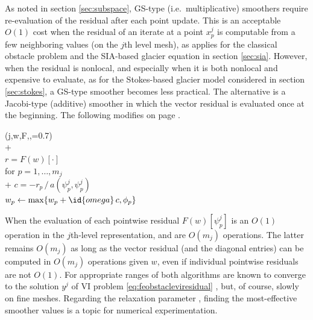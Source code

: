 \documentclass[letterpaper,final,12pt,reqno]{amsart}
\theoremstyle{claim}
\numberwithin{equation}{section}
\numberwithin{figure}{section}
\numberwithin{table}{section}
\numberwithin{theorem}{section}
\begin{document}
As noted in section \ref{sec:subspace}, GS-type (i.e.~multiplicative) smoothers require re-evaluation of the residual after each point update.  This is an acceptable $O(1)$ cost when the residual of an iterate at a point $x_p^j$ is computable from a few neighboring values (on the $j$th level mesh), as applies for the classical obstacle problem and the SIA-based glacier equation in section \ref{sec:sia}.  However, when the residual is nonlocal, and especially when it is both nonlocal and expensive to evaluate, as for the Stokes-based glacier model considered in section \ref{sec:stokes}, a GS-type smoother becomes less practical.  The alternative is a Jacobi-type (additive) smoother in which the vector residual is evaluated once at the beginning.  The following modifies  on page \pageref{ps:jacobi-sweep}.
\begin{pseudo*} \label{ps:pjacobi-sweep}
(j,w,F,\phi,=0.7)\text{:} \\+
     \\
    $r = F(w)[\cdot]$ \\
    for $p=1,\dots,m_j$ \\+
        $c = -r_p \,\big/\, a(\psi_p^j,\psi_p^j)$ \\
        $w_p \gets \max\{w_p + \id{omega}\,c, \phi_p\}$
\end{pseudo*}

When the evaluation of each pointwise residual $F(w)[\psi_p^j]$ is an $O(1)$ operation in the $j$th-level representation,  and  are $O(m_j)$ operations.  The latter remains $O(m_j)$ as long as the vector residual (and the diagonal entries) can be computed in $O(m_j)$ operations given $w$, even if individual pointwise residuals are not $O(1)$.  For appropriate ranges of  both algorithms are known to converge to the solution $y^j$ of VI problem \eqref{eq:feobstacleviresidual} \cite[Proposition 4.5]{GraeserKornhuber2009}, but, of course, slowly on fine meshes.  Regarding the relaxation parameter , finding the most-effective smoother values is a topic for numerical experimentation.
\end{document}
